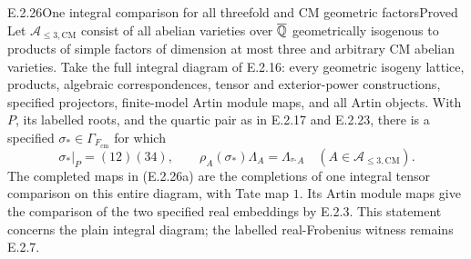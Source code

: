 \begin{result}{E.2.26}{One integral comparison for all threefold and CM geometric factors}{Proved}
Let \(\mathcal A_{\leq3,\mathrm{CM}}\) consist of all abelian varieties
over \(\overline{\mathbb Q}\) geometrically isogenous to products of simple factors of
dimension at most three and arbitrary CM abelian varieties. Take the
full integral diagram of E.2.16: every geometric isogeny lattice,
products, algebraic correspondences, tensor and exterior-power
constructions, specified projectors, finite-model Artin module maps,
and all Artin objects. With \(P\), its labelled roots, and the quartic
pair as in E.2.17 and E.2.23, there is a specified
\(\sigma_*\in\Gamma_{F_{\mathrm{cm}}}\) for which
\[
 \sigma_*|_P=(12)(34),\qquad
 \rho_A(\sigma_*)\Lambda_A=\Lambda_{{}^{\sigma_*}A}
       \quad(A\in\mathcal A_{\leq3,\mathrm{CM}}).
 \tag{E.2.26a}
\]
The completed maps in (E.2.26a) are the completions of one integral
tensor comparison on this entire diagram, with Tate map \(1\).
Its Artin module maps give the comparison of the two specified real
embeddings by E.2.3. This statement concerns the plain integral
diagram; the labelled real-Frobenius witness remains E.2.7.
\end{result}
